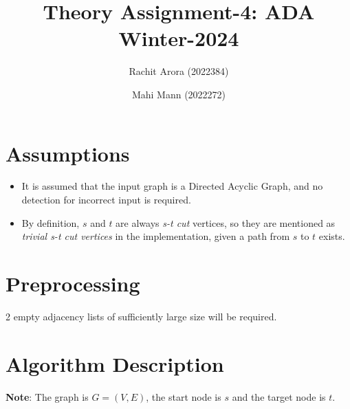 \documentclass{article}
\title{Theory Assignment-4: ADA Winter-2024}
\author{Rachit Arora (2022384) \and Mahi Mann (2022272)}
\date{}
\begin{document}
\maketitle

\section{Assumptions}

\begin{itemize}
    \item It is assumed that the input graph is a Directed Acyclic Graph, and no detection for incorrect input is required.

    \item By definition, $s$ and $t$ are always \emph{s-t cut} vertices, so they are mentioned as \emph{trivial s-t cut vertices} in the implementation, given a path from $s$ to $t$ exists. 
\end{itemize}

\section{Preprocessing}

2 empty adjacency lists of sufficiently large size will be required.

\section{Algorithm Description}

\textbf{Note}: The graph is $G = (V,E)$, the start node is $s$ and the target node is $t$.
\end{document}
